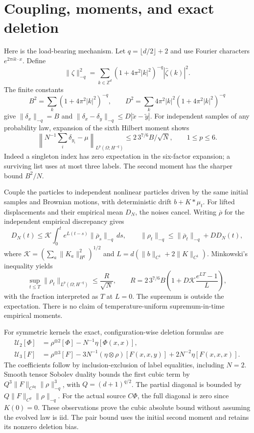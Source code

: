 \documentclass[11pt]{article}
\newcommand{\U}{\mathcal U}
\begin{document}
\section{Coupling, moments, and exact deletion}
Here is the load-bearing mechanism. Let $q=\lfloor d/2\rfloor+2$ and use
Fourier characters $e^{2\pi i k\cdot x}$. Define
\[
 \|\zeta\|_{-q}^2=\sum_{k\in\mathbb Z^d}
       (1+4\pi^2|k|^2)^{-q}|\widehat\zeta(k)|^2.
\]
The finite constants
\[
 B^2=\sum_k(1+4\pi^2|k|^2)^{-q},\qquad
 D^2=\sum_k4\pi^2|k|^2(1+4\pi^2|k|^2)^{-q}
\]
give $\|\delta_x\|_{-q}=B$ and
$\|\delta_x-\delta_y\|_{-q}\le D|\widetilde x-\widetilde y|$.
For independent samples of any probability law, expansion of the sixth
Hilbert moment shows
\[
 \left\|N^{-1}\sum_i\delta_{y_i}-\mu\right\|_{L^p(\Omega;H^{-q})}
       \le 2\,3^{7/6}B/\sqrt N,\qquad 1\le p\le6.
\]
Indeed a singleton index has zero expectation in the six-factor expansion;
a surviving list uses at most three labels. The second moment has the sharper
bound $B^2/N$.

Couple the particles to independent nonlinear particles driven by the same
initial samples and Brownian motions, with deterministic drift $b+K*\mu_t$.
For lifted displacements and their empirical mean $D_N$, the noises cancel.
Writing $\overline\rho$ for the independent empirical discrepancy gives
\[
 D_N(t)\le\mathcal K\int_0^t e^{L(t-s)}\|\overline\rho_s\|_{-q}\,ds,
 \qquad \|\rho_t\|_{-q}\le\|\overline\rho_t\|_{-q}+DD_N(t),
\]
where
$\mathcal K=(\sum_a\|K_a\|_{H^q}^2)^{1/2}$ and
$L=d(\|b\|_{C^1}+2\|K\|_{C^1})$.
Minkowski's inequality yields
\[
 \sup_{t\le T}\|\rho_t\|_{L^p(\Omega;H^{-q})}
 \le\frac{R}{\sqrt N},\qquad
 R=2\,3^{7/6}B\left(1+D\mathcal K\frac{e^{LT}-1}{L}\right),
\]
with the fraction interpreted as $T$ at $L=0$. The supremum is outside the
expectation. There is no claim of temperature-uniform supremum-in-time
empirical moments.

For symmetric kernels the exact, configuration-wise deletion formulas are
\begin{align*}
 \U_2[\Phi]&=\rho^{\otimes2}[\Phi]-N^{-1}\eta[\Phi(x,x)],\\
 \U_3[F]&=\rho^{\otimes3}[F]
 -3N^{-1}(\eta\otimes\rho)[F(x,x,y)]
 +2N^{-2}\eta[F(x,x,x)].
\end{align*}
The coefficients follow by inclusion-exclusion of label equalities, including
$N=2$. Smooth tensor Sobolev duality bounds the first cubic term by
$Q^3\|F\|_{C^{3q}}\|\rho\|_{-q}^3$, with $Q=(d+1)^{q/2}$.
The partial diagonal is bounded by $Q\|F\|_{C^q}\|\rho\|_{-q}$.
For the actual source $C\Phi$, the full diagonal is zero since $K(0)=0$.
These observations prove the cubic absolute bound without assuming the evolved
law is iid. The pair bound uses the initial second moment and retains its
nonzero deletion bias.
\end{document}
